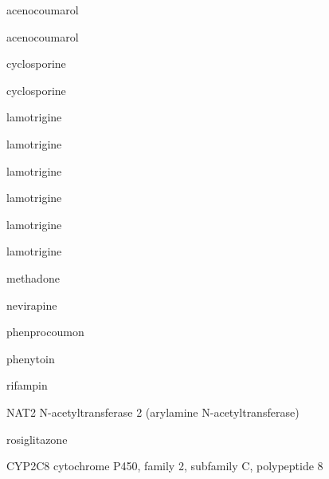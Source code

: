 \documentclass{resume} %
\begin{document}
\begin{rSection}{ acenocoumarol }
\begin{rSection}{ acenocoumarol }
\begin{rSection}{ cyclosporine }
\begin{rSection}{ cyclosporine }
\begin{rSection}{ lamotrigine }
\begin{rSection}{ lamotrigine }
\begin{rSection}{ lamotrigine }
\begin{rSection}{ lamotrigine }
\begin{rSection}{ lamotrigine }
\begin{rSection}{ lamotrigine }
\begin{rSection}{ methadone }
\begin{rSection}{ nevirapine }
\begin{rSection}{ phenprocoumon }
\begin{rSection}{ phenytoin }
\end{rSection}\begin{rSection}{ rifampin }
\item[]
\begin{rSubsection}{ NAT2 }{ N-acetyltransferase 2 (arylamine N-acetyltransferase) }{}{}
\item[]


\end{rSubsection}

\end{rSection}\begin{rSection}{ rosiglitazone }
\item[]
\begin{rSubsection}{ CYP2C8 }{ cytochrome P450, family 2, subfamily C, polypeptide 8 }{}{}
\item[]


\end{rSubsection}


\end{rSection}
\end{rSection}
\end{rSection}
\end{rSection}
\end{rSection}
\end{rSection}
\end{rSection}
\end{rSection}
\end{rSection}
\end{rSection}
\end{rSection}
\end{rSection}
\end{rSection}
\end{rSection}
\end{document}
